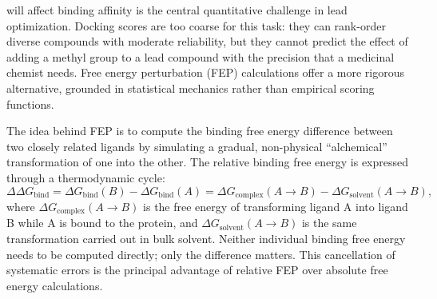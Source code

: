  will affect binding affinity is the central quantitative challenge in lead optimization. Docking scores are too coarse for this task: they can rank-order diverse compounds with moderate reliability, but they cannot predict the effect of adding a methyl group to a lead compound with the precision that a medicinal chemist needs. Free energy perturbation (FEP) calculations offer a more rigorous alternative, grounded in statistical mechanics rather than empirical scoring functions.

The idea behind FEP is to compute the binding free energy difference between two closely related ligands by simulating a gradual, non-physical ``alchemical'' transformation of one into the other. The relative binding free energy is expressed through a thermodynamic cycle:
\begin{equation}
  \label{eq:fep-cycle}
  \Delta\Delta G_{\text{bind}} = \Delta G_{\text{bind}}(B) - \Delta G_{\text{bind}}(A) = \Delta G_{\text{complex}}(A \!\to\! B) - \Delta G_{\text{solvent}}(A \!\to\! B),
\end{equation}
where $\Delta G_{\text{complex}}(A \!\to\! B)$ is the free energy of transforming ligand A into ligand B while A is bound to the protein, and $\Delta G_{\text{solvent}}(A \!\to\! B)$ is the same transformation carried out in bulk solvent. Neither individual binding free energy needs to be computed directly; only the difference matters. This cancellation of systematic errors is the principal advantage of relative FEP over absolute free energy calculations.

